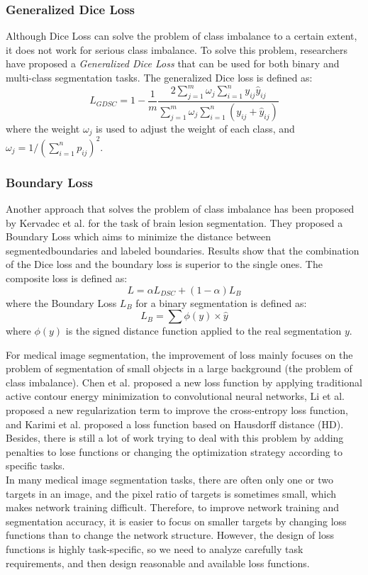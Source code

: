 \subsubsection{Generalized Dice Loss}
Although Dice Loss can solve the problem of class imbalance to a certain extent,
it does not work for serious class imbalance. To solve this problem, researchers
have proposed a \emph{Generalized Dice Loss} \cite{sudre2017generalised} that
can be used for both binary and multi-class segmentation tasks. The generalized
Dice loss is defined as:
$$
L_{GDSC} = 1 - \frac{1}{m}\frac{2\sum_{j=1}^{m} \omega_j
\sum_{i=1}^{n}y_{ij}\hat{y}_{ij}}{\sum_{j=1}^{m}\omega_j\sum_{i=1}^{n}(y_{ij} +
\hat{y}_{ij})}
$$
where the weight $\omega_j$ is used to adjust the weight of each class, and $\omega_j = 1/(\sum_{i=1}^{n}p_{ij})^2$.

\subsubsection{Boundary Loss}
Another approach that solves the problem of class imbalance has been proposed by
Kervadec et al. \cite{kervadec2019boundary} for the task of brain lesion
segmentation. They proposed a Boundary Loss which aims to minimize the distance
between segmentedboundaries and labeled boundaries. Results show that the
combination of the Dice loss and the boundary loss is superior to the single
ones. The composite loss is defined as:
$$
L = \alpha L_{DSC} + (1 - \alpha) L_{B}
$$
where the Boundary Loss $L_{B}$ for a binary segmentation is defined as:
$$
L_{B} = \sum \phi(y) \times \hat{y}
$$
where $\phi(y)$ is the signed distance function applied to the real segmentation $y$.

\par
For medical image segmentation, the improvement of loss mainly focuses on the
problem of segmentation of small objects in a large background (the problem of
class imbalance). Chen et al. \cite{kervadec2019boundary} proposed a new loss
function by applying traditional active contour energy minimization to
convolutional neural networks, Li et al. \cite{li2020transformation} proposed a
new regularization term to improve the cross-entropy loss function, and Karimi
et al. \cite{karimi2019reducing} proposed a loss function based on Hausdorff
distance (HD). Besides, there is still a lot of work trying to deal with this
problem by adding penalties to lose functions or changing the optimization
strategy according to specific tasks.\\
In many medical image segmentation tasks, there are often only one or two
targets in an image, and the pixel ratio of targets is sometimes small, which
makes network training difficult. Therefore, to improve network training and
segmentation accuracy, it is easier to focus on smaller targets by changing loss
functions than to change the network structure. However, the design of loss
functions is highly task-specific, so we need to analyze carefully task
requirements, and then design reasonable and available loss functions.

